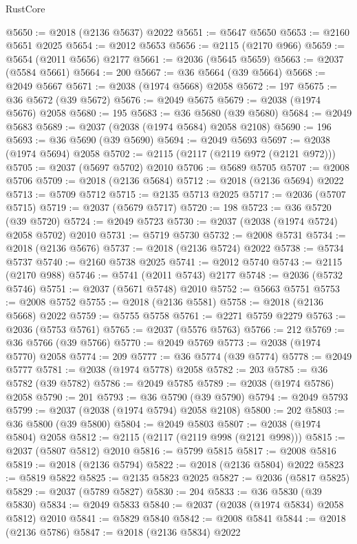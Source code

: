\begin{lexlean}{RustCore}
\begin{coremodule}
@5650 := @2018 (@2136 @5637) @2022
@5651 := @5647 @5650
@5653 := @2160 @5651 @2025
@5654 := @2012 @5653
@5656 := @2115 (@2170 @966)
@5659 := @5654 (@2011 @5656) @2177
@5661 := @2036 (@5645 @5659)
@5663 := @2037 (@5584 @5661)
@5664 := 200
@5667 := @36 @5664 (@39 @5664)
@5668 := @2049 @5667
@5671 := @2038 (@1974 @5668) @2058
@5672 := 197
@5675 := @36 @5672 (@39 @5672)
@5676 := @2049 @5675
@5679 := @2038 (@1974 @5676) @2058
@5680 := 195
@5683 := @36 @5680 (@39 @5680)
@5684 := @2049 @5683
@5689 := @2037 (@2038 (@1974 @5684) @2058 @2108)
@5690 := 196
@5693 := @36 @5690 (@39 @5690)
@5694 := @2049 @5693
@5697 := @2038 (@1974 @5694) @2058
@5702 := @2115 (@2117 (@2119 @972 (@2121 @972)))
@5705 := @2037 (@5697 @5702) @2010
@5706 := @5689 @5705
@5707 := @2008 @5706
@5709 := @2018 (@2136 @5684)
@5712 := @2018 (@2136 @5694) @2022
@5713 := @5709 @5712
@5715 := @2135 @5713 @2025
@5717 := @2036 (@5707 @5715)
@5719 := @2037 (@5679 @5717)
@5720 := 198
@5723 := @36 @5720 (@39 @5720)
@5724 := @2049 @5723
@5730 := @2037 (@2038 (@1974 @5724) @2058 @5702) @2010
@5731 := @5719 @5730
@5732 := @2008 @5731
@5734 := @2018 (@2136 @5676)
@5737 := @2018 (@2136 @5724) @2022
@5738 := @5734 @5737
@5740 := @2160 @5738 @2025
@5741 := @2012 @5740
@5743 := @2115 (@2170 @988)
@5746 := @5741 (@2011 @5743) @2177
@5748 := @2036 (@5732 @5746)
@5751 := @2037 (@5671 @5748) @2010
@5752 := @5663 @5751
@5753 := @2008 @5752
@5755 := @2018 (@2136 @5581)
@5758 := @2018 (@2136 @5668) @2022
@5759 := @5755 @5758
@5761 := @2271 @5759 @2279
@5763 := @2036 (@5753 @5761)
@5765 := @2037 (@5576 @5763)
@5766 := 212
@5769 := @36 @5766 (@39 @5766)
@5770 := @2049 @5769
@5773 := @2038 (@1974 @5770) @2058
@5774 := 209
@5777 := @36 @5774 (@39 @5774)
@5778 := @2049 @5777
@5781 := @2038 (@1974 @5778) @2058
@5782 := 203
@5785 := @36 @5782 (@39 @5782)
@5786 := @2049 @5785
@5789 := @2038 (@1974 @5786) @2058
@5790 := 201
@5793 := @36 @5790 (@39 @5790)
@5794 := @2049 @5793
@5799 := @2037 (@2038 (@1974 @5794) @2058 @2108)
@5800 := 202
@5803 := @36 @5800 (@39 @5800)
@5804 := @2049 @5803
@5807 := @2038 (@1974 @5804) @2058
@5812 := @2115 (@2117 (@2119 @998 (@2121 @998)))
@5815 := @2037 (@5807 @5812) @2010
@5816 := @5799 @5815
@5817 := @2008 @5816
@5819 := @2018 (@2136 @5794)
@5822 := @2018 (@2136 @5804) @2022
@5823 := @5819 @5822
@5825 := @2135 @5823 @2025
@5827 := @2036 (@5817 @5825)
@5829 := @2037 (@5789 @5827)
@5830 := 204
@5833 := @36 @5830 (@39 @5830)
@5834 := @2049 @5833
@5840 := @2037 (@2038 (@1974 @5834) @2058 @5812) @2010
@5841 := @5829 @5840
@5842 := @2008 @5841
@5844 := @2018 (@2136 @5786)
@5847 := @2018 (@2136 @5834) @2022

\end{coremodule}
\end{lexlean}
